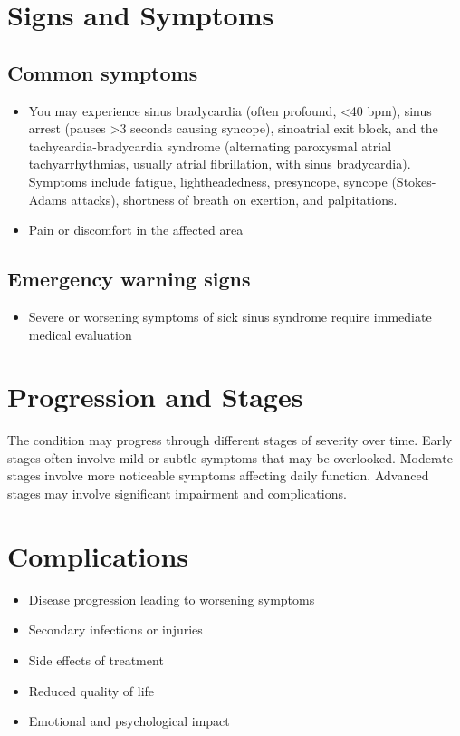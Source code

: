 \section{Signs and Symptoms}

\subsection{Common symptoms}
\begin{itemize}[noitemsep]
  \item You may experience sinus bradycardia (often profound, <40 bpm), sinus arrest (pauses >3 seconds causing syncope), sinoatrial exit block, and the tachycardia-bradycardia syndrome (alternating paroxysmal atrial tachyarrhythmias, usually atrial fibrillation, with sinus bradycardia). Symptoms include fatigue, lightheadedness, presyncope, syncope (Stokes-Adams attacks), shortness of breath on exertion, and palpitations.

  \item Pain or discomfort in the affected area
  \end{itemize}

\subsection{Emergency warning signs}
\begin{itemize}[noitemsep]
  \item Severe or worsening symptoms of sick sinus syndrome require immediate medical evaluation
\end{itemize}
\section{Progression and Stages}
The condition may progress through different stages of severity over time. Early stages often involve mild or subtle symptoms that may be overlooked. Moderate stages involve more noticeable symptoms affecting daily function. Advanced stages may involve significant impairment and complications.
\section{Complications}
\begin{itemize}[noitemsep]
  \item Disease progression leading to worsening symptoms
  \item Secondary infections or injuries
  \item Side effects of treatment
  \item Reduced quality of life
  \item Emotional and psychological impact
\end{itemize}
